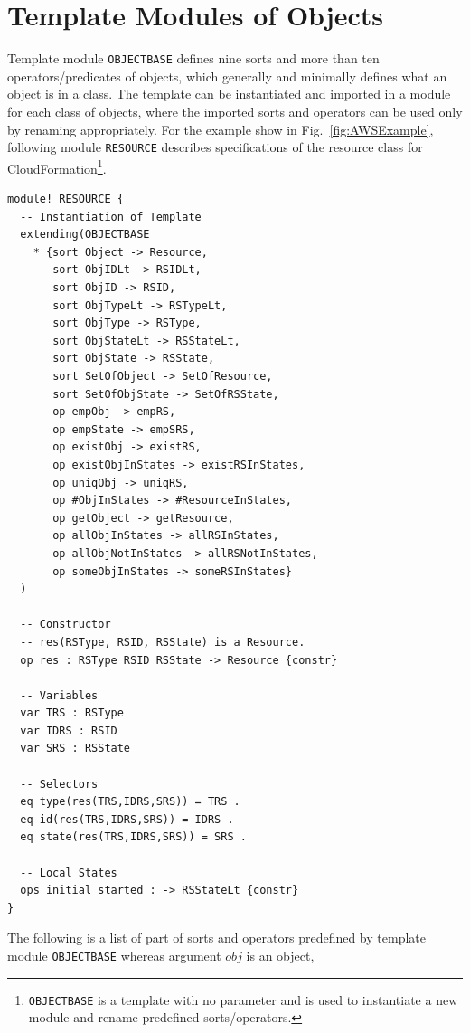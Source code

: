 \documentclass[12pt]{report}
\begin{document}
\section{Template Modules of Objects}
\label{sec:objectbase}
Template module {\tt OBJECTBASE} defines nine sorts and more than ten
operators/predicates of objects, which generally and minimally defines
what an object is in a class. The template can be instantiated and
imported in a module for each class of objects, where the imported
sorts and operators can be used only by renaming appropriately. For
the example show in Fig.~\ref{fig:AWSExample}, following module
{\tt RESOURCE} describes specifications of the resource class for
CloudFormation\footnote{{\tt OBJECTBASE} is a template with no
  parameter and is used to instantiate a new module and rename
  predefined sorts/operators.}.
\begin{verbatim}
module! RESOURCE {
  -- Instantiation of Template
  extending(OBJECTBASE
    * {sort Object -> Resource,
       sort ObjIDLt -> RSIDLt,
       sort ObjID -> RSID,
       sort ObjTypeLt -> RSTypeLt,
       sort ObjType -> RSType,
       sort ObjStateLt -> RSStateLt,
       sort ObjState -> RSState,
       sort SetOfObject -> SetOfResource,
       sort SetOfObjState -> SetOfRSState,
       op empObj -> empRS,
       op empState -> empSRS,
       op existObj -> existRS,
       op existObjInStates -> existRSInStates,
       op uniqObj -> uniqRS,
       op #ObjInStates -> #ResourceInStates,
       op getObject -> getResource,
       op allObjInStates -> allRSInStates,
       op allObjNotInStates -> allRSNotInStates,
       op someObjInStates -> someRSInStates}
  )

  -- Constructor
  -- res(RSType, RSID, RSState) is a Resource.
  op res : RSType RSID RSState -> Resource {constr}

  -- Variables
  var TRS : RSType
  var IDRS : RSID
  var SRS : RSState

  -- Selectors
  eq type(res(TRS,IDRS,SRS)) = TRS .
  eq id(res(TRS,IDRS,SRS)) = IDRS .
  eq state(res(TRS,IDRS,SRS)) = SRS .

  -- Local States
  ops initial started : -> RSStateLt {constr}
}
\end{verbatim}
The following is a list of part of sorts and operators predefined by
template module {\tt OBJECTBASE} whereas argument $obj$ is an object,
\end{document}
